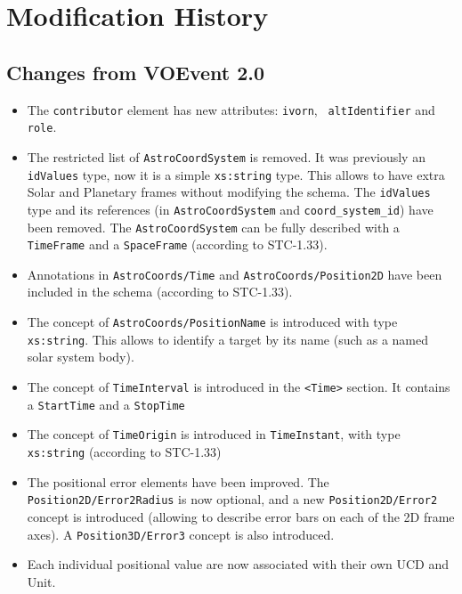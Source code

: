 \documentclass[11pt,a4paper]{ivoa}
\begin{document}


\appendix

\section{Modification History}
\subsection{Changes from VOEvent 2.0}
\label{appendix:last-changes}
\begin{itemize}
\item The \texttt{contributor} element has new attributes: \texttt{ivorn}, \texttt{
altIdentifier} and \texttt{role}. 
\item The restricted list of \texttt{AstroCoordSystem} is removed. It was 
previously an \texttt{idValues} type, now it is a simple \texttt{xs:string} type. 
This allows to have extra Solar and Planetary frames without modifying the 
schema. The \texttt{idValues} type and its references (in \texttt{AstroCoordSystem} 
and \texttt{coord\_system\_id}) have been removed. The \texttt{AstroCoordSystem} can 
be fully described with a \texttt{TimeFrame} and a \texttt{SpaceFrame}  (according to 
STC-1.33).
\item Annotations in \texttt{AstroCoords/Time} and \texttt{AstroCoords/Position2D} 
have been included in the schema (according to STC-1.33).
\item The concept of \texttt{AstroCoords/PositionName} is introduced with type {\tt
xs:string}. This allows to identify a target by its name (such as a named solar
system body). 
\item The concept of \texttt{TimeInterval} is introduced in the \texttt{<Time>} 
section. It contains a \texttt{StartTime} and a \texttt{StopTime}
\item The concept of \texttt{TimeOrigin} is introduced in \texttt{TimeInstant}, with 
type \texttt{xs:string} (according to STC-1.33)
\item The positional error elements have been improved. The \texttt{
Position2D/Error2Radius} is now optional, and a new \texttt{Position2D/Error2} 
concept is introduced (allowing to describe error bars on each of the 2D frame 
axes). A \texttt{Position3D/Error3} concept is also introduced.
\item Each individual positional value are now associated with their own UCD 
and Unit. 
\end{itemize}
\end{document}
